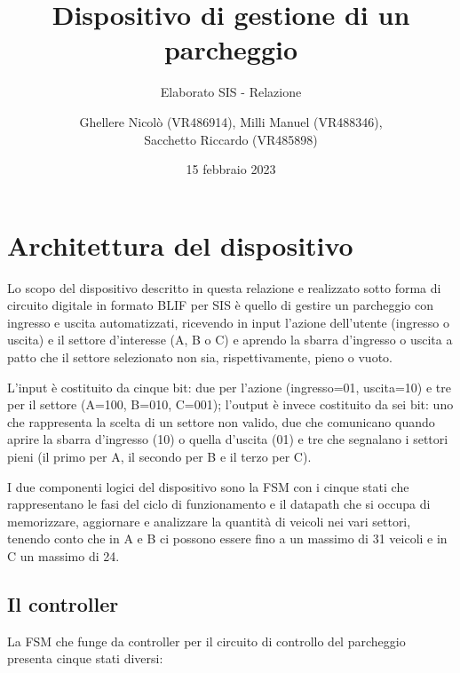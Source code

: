 \documentclass[
  12pt,
  a4paper,
  headings=optiontoheadandtoc
]{scrreprt}
\author{Ghellere Nicolò (VR486914), Milli Manuel (VR488346),\\Sacchetto Riccardo (VR485898)}
\date{15 febbraio 2023}
\title{Dispositivo di gestione di un parcheggio}
\subtitle{Elaborato SIS - Relazione}
\begin{document}
\maketitle

\renewcommand*\contentsname{Indice}
\tableofcontents
\newpage

\chapter[nonumber=true]{Architettura del dispositivo}

Lo scopo del dispositivo descritto in questa relazione e realizzato sotto forma di circuito digitale in formato BLIF per SIS è quello di gestire un parcheggio con ingresso e uscita automatizzati, ricevendo in input l'azione dell'utente (ingresso o uscita) e il settore d'interesse (A, B o C) e aprendo la sbarra d'ingresso o uscita a patto che il settore selezionato non sia, rispettivamente, pieno o vuoto.

L'input è costituito da cinque bit: due per l'azione (ingresso=01, uscita=10) e tre per il settore (A=100, B=010, C=001); l'output è invece costituito da sei bit: uno che rappresenta la scelta di un settore non valido, due che comunicano quando aprire la sbarra d'ingresso (10) o quella d'uscita (01) e tre che segnalano i settori pieni (il primo per A, il secondo per B e il terzo per C).

I due componenti logici del dispositivo sono la FSM con i cinque stati che rappresentano le fasi del ciclo di funzionamento e il datapath che si occupa di memorizzare, aggiornare e analizzare la quantità di veicoli nei vari settori, tenendo conto che in A e B ci possono essere fino a un massimo di 31 veicoli e in C un massimo di 24.

\section[nonumber=true]{Il controller}

La FSM che funge da controller per il circuito di controllo del parcheggio presenta cinque stati diversi:
\end{document}
